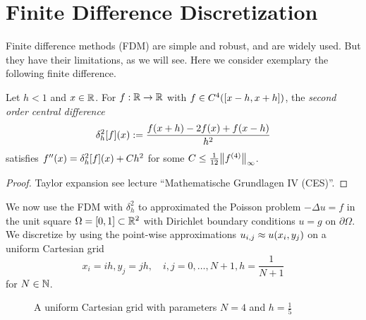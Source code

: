 \section{Finite Difference Discretization}

Finite difference methods (FDM) are simple and robust, and are widely used.
But they have their limitations, as we will see.
Here we consider exemplary the following finite difference.

\begin{theorem}
	Let \(h < 1\) and \(x \in \R\).
	For \(f: \R \to \R\) with \(f \in C^4\parentheses*{\brackets*{x - h, x + h}}\), the \emph{second order central difference}
	\[
		\delta_h^2\brackets*{f}\parentheses*{x} := \frac{f\parentheses*{x + h} - 2f\parentheses*{x} + f\parentheses*{x - h}}{h^2}
	\]
	satisfies \(f''\parentheses*{x} = \delta_h^2\brackets*{f}\parentheses*{x} + Ch^2\) for some \(C \le \frac{1}{12}\norm*{f^{\parentheses*{4}}}_\infty\).
\end{theorem}

\begin{proof}
	Taylor expansion see lecture ``Mathematische Grundlagen IV (CES)''.
\end{proof}

We now use the FDM with \(\delta_h^2\) to approximated the Poisson problem \(-\Delta u = f\) in the unit square \(\Omega = \brackets*{0, 1} \subset \R^2\) with Dirichlet boundary conditions \(u = g\) on \(\partial\Omega\).
We discretize by using the point-wise approximations \(u_{i, j} \approx u\parentheses*{x_i, y_j}\) on a uniform Cartesian grid
\[
	x_i = ih, y_j = jh, \quad i, j = 0, \ldots, N + 1, h = \frac{1}{N + 1}
\]
for \(N \in \N\).

\begin{figure}[h]
	\centering
	\caption{A uniform Cartesian grid with parameters \(N = 4\) and \(h = \frac{1}{5}\)}
	\label{fig:1-1}
\end{figure}

